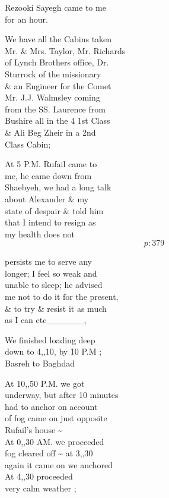 \documentclass{report}
\begin{document}
	\par{
 	Rezooki Sayegh came to me\ \\for an hour.\ \\
	}

	\par{
 	We have all the Cabins taken\ \\Mr. \& Mrs. Taylor, Mr. Richards\ \\of Lynch Brothers office, Dr.\ \\Sturrock of the missionary\ \\\& an Engineer for the Comet\ \\Mr. J.J. Walmsley coming\ \\from the SS. Laurence from\ \\Bushire all in the 4 1st Class\ \\\& Ali Beg Zheir in a 2nd\ \\Class Cabin;\ \\
	}

	\par{
 	At 5 P.M. Rufail came to\ \\me, he came down from\ \\Shaebyeh, we had a long talk\ \\about Alexander \& my\ \\state of despair \& told him\ \\that I intend to resign as\ \\my health does not\ \\
  \[p: 379 \]

	}



	\par{
 	persists me to serve any\ \\longer; I feel so weak and\ \\unable to sleep; he advised\ \\me not to do it for the present,\ \\\& to try \& resist it as much\ \\as I can etc\_\_\_\_\_\_,\ \\
	}

	\par{
 	We finished loading deep\ \\down to 4,,10, by 10 P.M ;\ \\Basreh to Baghdad\ \\
	}

	\par{
 	At 10,,50 P.M. we got\ \\underway, but after 10 minutes\ \\had to anchor on account\ \\of fog came on just opposite\ \\Rufail's house \~{}\ \\At 0,,30 AM. we proceeded\ \\fog cleared off \~{} at 3,,30\ \\again it came on we anchored\ \\At 4,,30 proceeded\ \\very calm weather ;\ \\
	}
\end{document}
